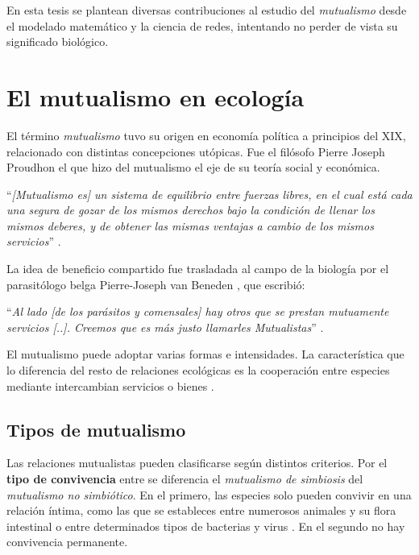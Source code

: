 En esta tesis se plantean diversas contribuciones al estudio del \textit{mutualismo} desde el modelado matemático y la ciencia de redes, intentando no perder de vista su significado biológico.

\section{El mutualismo en ecología}

El término \textit{mutualismo} tuvo su origen en economía política a principios del XIX, relacionado con distintas concepciones utópicas. Fue el filósofo Pierre Joseph Proudhon el que hizo del mutualismo el eje de su teoría social y económica.

\enquote{\itshape [Mutualismo es] un sistema de equilibrio entre fuerzas libres, en el cual está cada una segura de gozar de los mismos derechos bajo la condición de llenar los mismos deberes, y 
de obtener las mismas ventajas a cambio de los mismos servicios} \cite{proudhon1868capacite}.

La idea de beneficio compartido fue trasladada al campo de la biología por el parasitólogo belga Pierre-Joseph van Beneden \cite{boucher1982ecology}, que escribió:

\enquote{\itshape Al lado [de los parásitos y comensales] hay otros que se prestan mutuamente servicios [..]. Creemos que es más justo llamarles Mutualistas} \cite{van1878commensaux}.

El mutualismo puede adoptar varias formas e intensidades. La característica que lo diferencia del resto de relaciones ecológicas es la cooperación entre especies mediante intercambian servicios o bienes \cite{bronstein2001exploitation}.


\subsection{Tipos de mutualismo}
\label{TIPOS_DE_MUTUALISMO}
	
Las relaciones mutualistas pueden clasificarse según distintos criterios. Por el \textbf{tipo de convivencia} entre se diferencia el \textit{mutualismo de simbiosis} del \textit{mutualismo no simbiótico}. En el primero, las especies solo pueden convivir en una relación íntima, como las que se estableces entre numerosos animales y su flora intestinal o entre determinados tipos de bacterias y virus \cite{moran2005players, thrall2007coevolution}. En el segundo no hay convivencia permanente.
	

